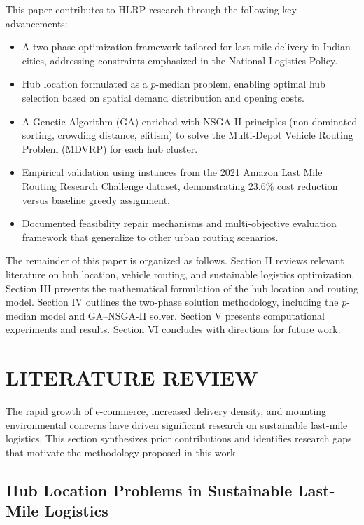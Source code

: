 \documentclass[conference]{IEEEtran}
\begin{document}
This paper contributes to HLRP research through the following key advancements:

\begin{itemize}
\item A two-phase optimization framework tailored for last-mile delivery in Indian cities, addressing constraints emphasized in the National Logistics Policy.
\item Hub location formulated as a $p$-median problem, enabling optimal hub selection based on spatial demand distribution and opening costs.
\item A Genetic Algorithm (GA) enriched with NSGA-II principles (non-dominated sorting, crowding distance, elitism) to solve the Multi-Depot Vehicle Routing Problem (MDVRP) for each hub cluster.
\item Empirical validation using instances from the 2021 Amazon Last Mile Routing Research Challenge dataset, demonstrating 23.6\% cost reduction versus baseline greedy assignment.
\item Documented feasibility repair mechanisms and multi-objective evaluation framework that generalize to other urban routing scenarios.
\end{itemize}

The remainder of this paper is organized as follows. Section II reviews relevant literature on hub location, vehicle routing, and sustainable logistics optimization. Section III presents the mathematical formulation of the hub location and routing model. Section IV outlines the two-phase solution methodology, including the $p$-median model and GA–NSGA-II solver. Section V presents computational experiments and results. Section VI concludes with directions for future work.

\section{LITERATURE REVIEW}

The rapid growth of e-commerce, increased delivery density, and mounting environmental concerns have driven significant research on sustainable last-mile logistics. This section synthesizes prior contributions and identifies research gaps that motivate the methodology proposed in this work.

\subsection{Hub Location Problems in Sustainable Last-Mile Logistics}
\end{document}
